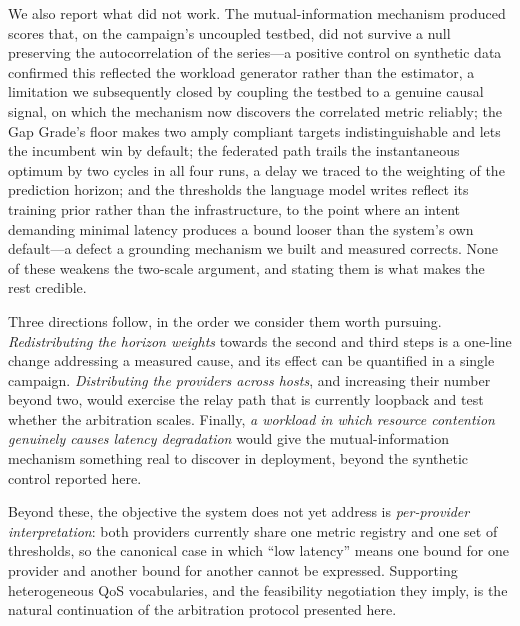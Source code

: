 \documentclass[conference]{IEEEtran}
\begin{document}
We also report what did not work. The mutual-information mechanism produced
scores that, on the campaign's uncoupled testbed, did not survive a null
preserving the autocorrelation of the series---a positive control on
synthetic data confirmed this reflected the workload generator rather than
the estimator, a limitation we subsequently closed by coupling the testbed to
a genuine causal signal, on which the mechanism now discovers the correlated
metric reliably; the Gap
Grade's floor makes two amply compliant targets indistinguishable and lets
the incumbent win by default; the federated path trails the instantaneous
optimum by two cycles in all four runs, a delay we traced to the weighting of
the prediction horizon; and the thresholds the language model writes reflect
its training prior rather than the infrastructure, to the point where an
intent demanding minimal latency produces a bound looser than the system's
own default---a defect a grounding mechanism we built and measured corrects.
None of these weakens the two-scale argument, and stating them is what makes
the rest credible.

Three directions follow, in the order we consider them worth pursuing.
\emph{Redistributing the horizon weights} towards the second and third steps
is a one-line change addressing a measured cause, and its effect can be
quantified in a single campaign. \emph{Distributing the providers across
hosts}, and increasing their number beyond two, would exercise the relay path
that is currently loopback and test whether the arbitration scales. Finally,
\emph{a workload in which resource contention genuinely causes latency
degradation} would give the mutual-information mechanism something real to
discover in deployment, beyond the synthetic control reported here.

Beyond these, the objective the system does not yet address is
\emph{per-provider interpretation}: both providers currently share one metric
registry and one set of thresholds, so the canonical case in which
``low latency'' means one bound for one provider and another bound for
another cannot be expressed. Supporting heterogeneous QoS vocabularies, and
the feasibility negotiation they imply, is the natural continuation of the
arbitration protocol presented here.



\end{document}
